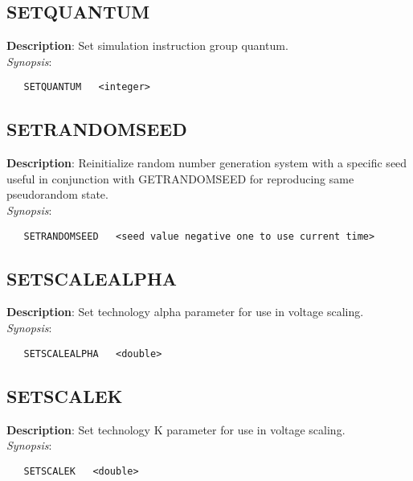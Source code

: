 \subsection{\bf SETQUANTUM}
\label{manpages:SETQUANTUM}
\label{manpages:setquantum}
\vspace{-0.2in}
{\bf Description}: 	Set simulation instruction group quantum.\\[1.5ex]
{\em Synopsis}:
\vspace{-0.2in}
\scriptsize
\begin{verbatim}
   SETQUANTUM   <integer>			
\end{verbatim}
\normalsize
\vspace{-0.2in}


\subsection{\bf SETRANDOMSEED}
\label{manpages:SETRANDOMSEED}
\label{manpages:setrandomseed}
\vspace{-0.2in}
{\bf Description}: 	Reinitialize random number generation system with a specific seed useful in conjunction with GETRANDOMSEED for reproducing same pseudorandom state.\\[1.5ex]
{\em Synopsis}:
\vspace{-0.2in}
\scriptsize
\begin{verbatim}
   SETRANDOMSEED   <seed value negative one to use current time>	
\end{verbatim}
\normalsize
\vspace{-0.2in}


\subsection{\bf SETSCALEALPHA}
\label{manpages:SETSCALEALPHA}
\label{manpages:setscalealpha}
\vspace{-0.2in}
{\bf Description}: 	Set technology alpha parameter for use in voltage scaling.\\[1.5ex]
{\em Synopsis}:
\vspace{-0.2in}
\scriptsize
\begin{verbatim}
   SETSCALEALPHA   <double>		
\end{verbatim}
\normalsize
\vspace{-0.2in}


\subsection{\bf SETSCALEK}
\label{manpages:SETSCALEK}
\label{manpages:setscalek}
\vspace{-0.2in}
{\bf Description}: 	Set technology K parameter for use in voltage scaling.\\[1.5ex]
{\em Synopsis}:
\vspace{-0.2in}
\scriptsize
\begin{verbatim}
   SETSCALEK   <double>		
\end{verbatim}
\normalsize
\vspace{-0.2in}


